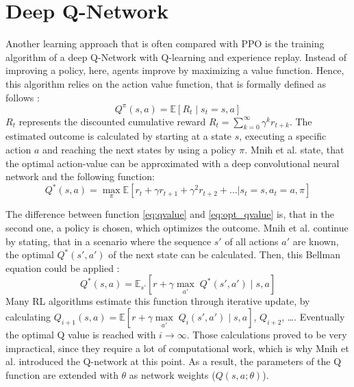 \section{Deep Q-Network}\label{dqn}
Another learning approach that is often compared with PPO is the training algorithm of a deep Q-Network with Q-learning and experience replay. Instead of improving a policy, here, agents improve by maximizing a value function. Hence, this algorithm relies on the action value function, that is formally defined as follows \cite{mnba16}:
\begin{equation}\label{eq:qvalue}
    Q^\pi(s,a) = \mathbb{E} \left[ R_t \mid s_t = s,a \right]
\end{equation} 
$R_t$ represents the discounted cumulative reward $R_t=\sum^{\infty}_{k=0} \gamma^k r_{t+k}$. The estimated outcome is calculated by starting at a state $s$, executing a specific action $a$ and reaching the next states by using a policy $\pi$. Mnih et al. \cite{mnka15} state, that the optimal action-value can be approximated with a deep convolutional neural network and the following function:
\begin{equation}\label{eq:opt_qvalue}
    Q^*(s,a) =  \underset{\pi} \max \mathbb{E}\left[ r_{t} + \gamma r_{t+1} + \gamma^2 r_{t+2} + \ldots | s_t = s, a_t = a, \pi \right]
\end{equation}

The difference between function \eqref{eq:qvalue} and \eqref{eq:opt_qvalue} is, that in the second one, a policy is chosen, which optimizes the outcome. Mnih et al. continue by stating, that in a scenario where the sequence $s'$ of all actions $a'$ are known, the optimal $Q^*(s',a')$ of the next state can be calculated. Then, this Bellman equation could be applied \cite{mnba16}: 
\begin{equation}\label{eq:bel_qvalue}
    Q^*(s,a) =  \mathbb{E}_{s'} \left[ r+ \gamma \underset{a'}\max \; Q^* (s', a') \mid s,a \right]
\end{equation}
Many RL algorithms estimate this function through iterative update, by calculating $Q_{i+1}(s,a) =  \mathbb{E} \left[ r+ \gamma \underset{a'}\max \; Q_i (s', a') \mid s,a \right]$, $Q_{i+2}$, \dots \cite{mnka13}. Eventually the optimal Q value is reached with $i\rightarrow \infty$. Those calculations proved to be very impractical, since they require a lot of computational work, which is why Mnih et al. introduced the Q-network at this point. As a result, the parameters of the Q function are extended with $\theta$ as network weights ($Q(s,a;\theta)$).

